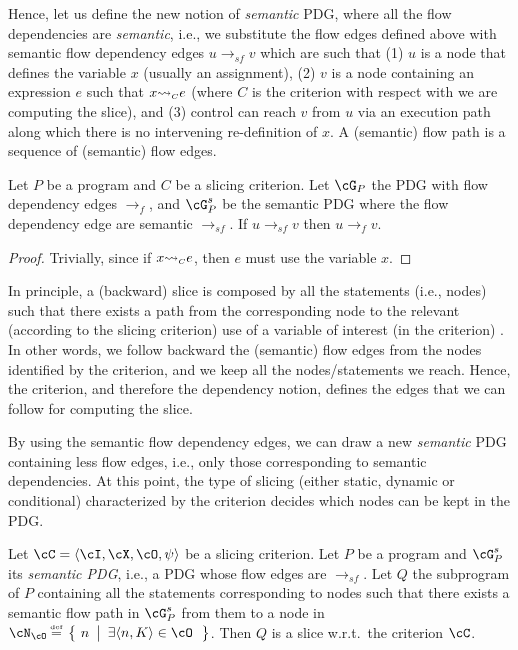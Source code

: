 \documentclass[prodmode,acmtocl]{acmsmall}
\def\prog{\ensuremath{P}\xspace}
\def\progq{\ensuremath{Q}\xspace}
\def\crit{\ensuremath{C}\xspace}
\newcommand{\lra}{\longrightarrow}
\def\defi{\mbox{\raisebox{0ex}[1ex][1ex]{$\stackrel{\mbox{\tiny
def}}{\; =\;}$}}}
\newcommand{\sset}[2]{\left\{~#1 ~ \left |
                               \begin{array}{l}#2\end{array}
                          \right.     \right\}}
\def\tuple#1{\langle #1 \rangle}
\newcommand{\0}{\mbox{\bf 0}}
\newcommand{\BINARYINFIXFUNCTION}[3]{\ifthenelse{\equal{#2}{}}{}{#2} #1 \ifthenelse{\equal{#3}{}}{}{#3}}
\def\exp{e}
\newcommand{\CDEPENDS}[3]{\BINARYINFIXFUNCTION{{\rightsquigarrow}_{\mbox{\tiny\sc $#1$}}}{#2}{#3}}
\begin{document}
Hence, let us define the new notion of \emph{semantic} PDG, where all
the flow dependencies are {\em semantic}, i.e., we substitute the flow
edges defined above with semantic flow dependency edges $u\lra_{sf} v$
which are such that (1) $u$ is a node that defines the variable $x$
(usually an assignment), (2) $v$ is a node containing an expression
$\exp$ such that $\CDEPENDS{\crit}{x}{\exp}$ (where $\crit$ is the
criterion with respect with we are computing the slice), and (3)
control can reach $v$ from $u$ via an execution path along which there
is no intervening re-definition of $x$. A (semantic) flow path is a
sequence of (semantic) flow edges.

\begin{proposition}\label{prop:flowdep}
  Let $\prog$ be a program and $\crit$ be a slicing criterion. Let
  $\cG_\prog$ the PDG with flow dependency edges $\lra_f$, and
  $\cG_\prog^{s}$ be the semantic PDG where the flow dependency edge
  are semantic $\lra_{sf}$. If $u\lra_{sf}v$ then $u\lra_{f}v$.
\end{proposition}

\begin{proof}
  Trivially, since if $\CDEPENDS{\crit}{x}{\exp}$, then $\exp$ must
  use the variable $x$.
\end{proof}

In principle, a (backward) slice is composed by all the statements
(i.e., nodes) such that there exists a path from the corresponding
node to the relevant (according to the slicing criterion) use of a
variable of interest (in the criterion) \cite{RY88}.
In other words, we follow backward the (semantic) flow edges from the
nodes identified by the criterion, and we keep all the
nodes/statements we reach.  Hence, the criterion, and therefore the
dependency notion, defines the edges that we can follow for computing
the slice.
 
By using the semantic flow dependency edges, we can draw a new
\emph{semantic} PDG containing less flow edges, i.e., only those
corresponding to semantic dependencies.  At this point, the type of
slicing (either static, dynamic or conditional) characterized by the
criterion decides which nodes can be kept in the PDG.

\begin{theorem}\label{th:slispdg}
  Let $\cC=\tuple{\cI,\cX,\cO,\psi}$ be a slicing criterion. Let
  $\prog$ be a program and $\cG^s_\prog$ its \emph{semantic PDG},
  i.e., a PDG whose flow edges are $\lra_{sf}$.  Let $\progq$ the
  subprogram of $\prog$ containing all the statements corresponding to
  nodes such that there exists a semantic flow path in $\cG^s_\prog$
  from them to a node in
  $\cN_{\cO}\defi\sset{n}{\exists\tuple{n,K}\in\cO}$. Then $\progq$ is
  a slice w.r.t.\ the criterion $\cC$.
\end{theorem}
\end{document}
